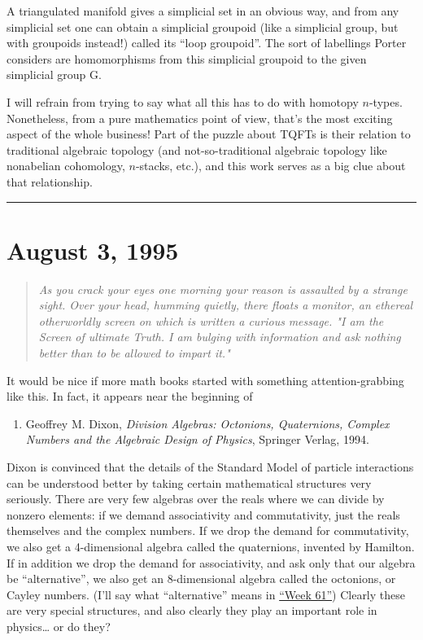 \documentclass{article}
\def\tightlist{}
\begin{document}
A triangulated manifold gives a simplicial set in an obvious way, and
from any simplicial set one can obtain a simplicial groupoid (like a
simplicial group, but with groupoids instead!) called its ``loop
groupoid''. The sort of labellings Porter considers are homomorphisms
from this simplicial groupoid to the given simplicial group G.

I will refrain from trying to say what all this has to do with homotopy
\(n\)-types. Nonetheless, from a pure mathematics point of view, that's
the most exciting aspect of the whole business! Part of the puzzle about
TQFTs is their relation to traditional algebraic topology (and
not-so-traditional algebraic topology like nonabelian cohomology,
\(n\)-stacks, etc.), and this work serves as a big clue about that
relationship.

\begin{center}\rule{0.5\linewidth}{0.5pt}\end{center}
\hypertarget{week59}{%
\section{August 3, 1995}\label{week59}}

\begin{quote}
\emph{As you crack your eyes one morning your reason is assaulted by a}
\emph{strange sight. Over your head, humming quietly, there floats a}
\emph{monitor, an ethereal otherworldly screen on which is written a
curious} \emph{message. "I am the Screen of ultimate Truth. I am bulging
with} \emph{information and ask nothing better than to be allowed to
impart it."}
\end{quote}

It would be nice if more math books started with something
attention-grabbing like this. In fact, it appears near the beginning of

\begin{enumerate}
\def\labelenumi{\arabic{enumi})}
\tightlist
\item
  Geoffrey M. Dixon, \emph{Division Algebras: Octonions, Quaternions,
  Complex Numbers and the Algebraic Design of Physics}, Springer Verlag,
  1994.
\end{enumerate}

Dixon is convinced that the details of the Standard Model of particle
interactions can be understood better by taking certain mathematical
structures very seriously. There are very few algebras over the reals
where we can divide by nonzero elements: if we demand associativity and
commutativity, just the reals themselves and the complex numbers. If we
drop the demand for commutativity, we also get a 4-dimensional algebra
called the quaternions, invented by Hamilton. If in addition we drop the
demand for associativity, and ask only that our algebra be
``alternative'', we also get an 8-dimensional algebra called the
octonions, or Cayley numbers. (I'll say what ``alternative'' means in
\protect\hyperlink{week61}{``Week 61''}) Clearly these are very special
structures, and also clearly they play an important role in
physics\ldots{} or do they?
\end{document}
